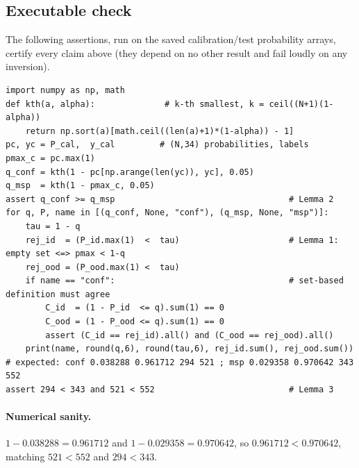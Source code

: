 \subsection{Executable check}
The following assertions, run on the saved calibration/test probability arrays, certify every
claim above (they depend on no other result and fail loudly on any inversion).
\begin{verbatim}
import numpy as np, math
def kth(a, alpha):              # k-th smallest, k = ceil((N+1)(1-alpha))
    return np.sort(a)[math.ceil((len(a)+1)*(1-alpha)) - 1]
pc, yc = P_cal,  y_cal         # (N,34) probabilities, labels
pmax_c = pc.max(1)
q_conf = kth(1 - pc[np.arange(len(yc)), yc], 0.05)
q_msp  = kth(1 - pmax_c, 0.05)
assert q_conf >= q_msp                                   # Lemma 2
for q, P, name in [(q_conf, None, "conf"), (q_msp, None, "msp")]:
    tau = 1 - q
    rej_id  = (P_id.max(1)  <  tau)                      # Lemma 1: empty set <=> pmax < 1-q
    rej_ood = (P_ood.max(1) <  tau)
    if name == "conf":                                   # set-based definition must agree
        C_id  = (1 - P_id  <= q).sum(1) == 0
        C_ood = (1 - P_ood <= q).sum(1) == 0
        assert (C_id == rej_id).all() and (C_ood == rej_ood).all()
    print(name, round(q,6), round(tau,6), rej_id.sum(), rej_ood.sum())
# expected: conf 0.038288 0.961712 294 521 ; msp 0.029358 0.970642 343 552
assert 294 < 343 and 521 < 552                           # Lemma 3
\end{verbatim}
\paragraph{Numerical sanity.} $1-0.038288=0.961712$ and $1-0.029358=0.970642$, so
$0.961712<0.970642$, matching $521<552$ and $294<343$.
